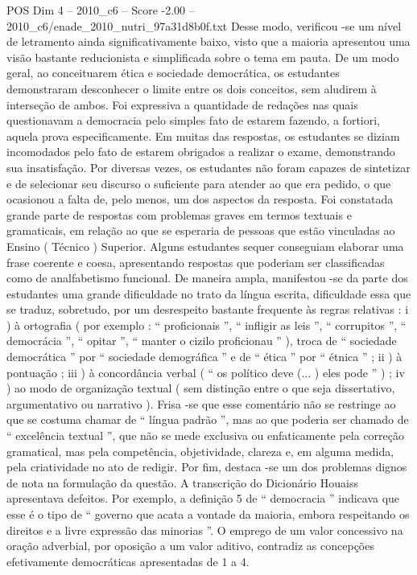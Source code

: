 \begin{textsample}{POS Dim 4 – 2010\_c6 – Score -2.00 – 2010\_c6/enade\_2010\_nutri\_97a31d8b0f.txt}
Desse modo, verificou -se um nível de letramento ainda significativamente baixo, visto que a maioria apresentou uma visão bastante reducionista e simplificada sobre o tema em pauta.
De um modo geral, ao conceituarem ética e sociedade democrática, os estudantes demonstraram desconhecer o limite entre os dois conceitos, sem aludirem à interseção de ambos.
Foi expressiva a quantidade de redações nas quais questionavam a democracia pelo simples fato de estarem fazendo, a fortiori, aquela prova especificamente.
Em muitas das respostas, os estudantes se diziam incomodados pelo fato de estarem obrigados a realizar o exame, demonstrando sua insatisfação.
Por diversas vezes, os estudantes não foram capazes de sintetizar e de selecionar seu discurso o suficiente para atender ao que era pedido, o que ocasionou a falta de, pelo menos, um dos aspectos da resposta.
Foi constatada grande parte de respostas com problemas graves em termos textuais e gramaticais, em relação ao que se esperaria de pessoas que estão vinculadas ao Ensino ( Técnico ) Superior.
Alguns estudantes sequer conseguiam elaborar uma frase coerente e coesa, apresentando respostas que poderiam ser classificadas como de analfabetismo funcional.
De maneira ampla, manifestou -se da parte dos estudantes uma grande dificuldade no trato da língua escrita, dificuldade essa que se traduz, sobretudo, por um desrespeito bastante frequente às regras relativas : i ) à ortografia ( por exemplo : “ proficionais ”, “ infligir as leis ”, “ corrupitos ”, “ democrácia ”, “ opitar ”, “ manter o cizilo proficionau ” ), troca de “ sociedade democrática ” por “ sociedade demográfica ” e de “ ética ” por “ étnica ” ; ii ) à pontuação ; iii ) à concordância verbal ( “ os político deve (... ) eles pode ” ) ; iv ) ao modo de organização textual ( sem distinção entre o que seja dissertativo, argumentativo ou narrativo ).
Frisa -se que esse comentário não se restringe ao que se costuma chamar de “ língua padrão ”, mas ao que poderia ser chamado de “ excelência textual ”, que não se mede exclusiva ou enfaticamente pela correção gramatical, mas pela competência, objetividade, clareza e, em alguma medida, pela criatividade no ato de redigir.
Por fim, destaca -se um dos problemas dignos de nota na formulação da questão.
A transcrição do Dicionário Houaiss apresentava defeitos.
Por exemplo, a definição 5 de “ democracia ” indicava que esse é o tipo de “ governo que acata a vontade da maioria, embora respeitando os direitos e a livre expressão das minorias ”.
O emprego de um valor concessivo na oração adverbial, por oposição a um valor aditivo, contradiz as concepções efetivamente democráticas apresentadas de 1 a 4.

\end{textsample}
